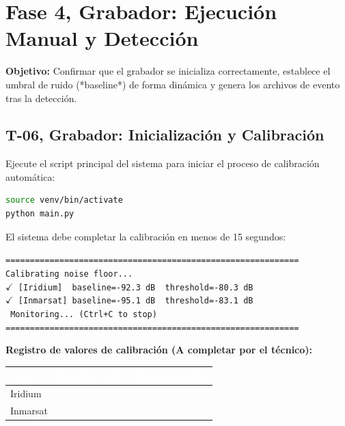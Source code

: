 \section{Fase 4, Grabador: Ejecución Manual y Detección}

\textbf{Objetivo:} Confirmar que el grabador se inicializa correctamente, establece el umbral de ruido (*baseline*) de forma dinámica y genera los archivos de evento tras la detección.

\subsection{T-06, Grabador: Inicialización y Calibración}

Ejecute el script principal del sistema para iniciar el proceso de calibración automática:

\begin{lstlisting}[language=bash]
source venv/bin/activate
python main.py
\end{lstlisting}

\begin{tcolorbox}[colback=gray!5, colframe=deyposcolor, title=Resultado esperado (T-06)]
El sistema debe completar la calibración en menos de 15 segundos:
\vspace{0.2cm}
\begin{center}
    \texttt{============================================================} \\
    \texttt{Calibrating noise floor...} \\
    \texttt{\quad \textcolor{green!60!black}{$\checkmark$} [Iridium] \ baseline=-92.3 dB \ threshold=-80.3 dB} \\
    \texttt{\quad \textcolor{green!60!black}{$\checkmark$} [Inmarsat] baseline=-95.1 dB \ threshold=-83.1 dB} \\
    \texttt{\textbullet \ Monitoring... (Ctrl+C to stop)} \\
    \texttt{============================================================}
\end{center}
\end{tcolorbox}

\vspace{0.4cm}
\textbf{Registro de valores de calibración (A completar por el técnico):}

\begin{table}[h]
    \centering
    \renewcommand{\arraystretch}{2} %
    \begin{tabularx}{0.8\textwidth}{|l|X|X|}
        \hline
        \rowcolor{deyposcolor} 
        \textbf{\textcolor{white}{Grupo}} & \textbf{\textcolor{white}{Baseline (dB)}} & \textbf{\textcolor{white}{Threshold (dB)}} \\ \hline
        Iridium  & & \\ \hline
        Inmarsat & & \\ \hline
    \end{tabularx}
\end{table}

